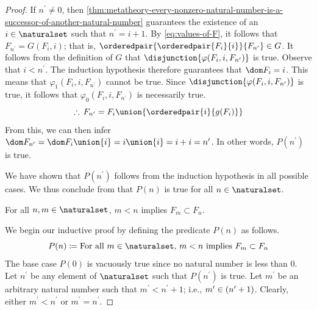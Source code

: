 \begin{proof}
    \vspace{0.3cm}
    \noindent
    If \( n^{\prime} \neq 0 \), then \cref{thm:metatheory-every-nonzero-natural-number-is-a-successor-of-another-natural-number} guarantees the existence
    of an \( i \in \naturalset \) such that \( n^{\prime} = i + 1 \).
    By \eqref{eq:values-of-F}, it follows that \( F_{n^{\prime}} = G(F_{i}, i) \); that is,
    \( \orderedpair{\orderedpair{F_{i}}{i}}{F_{n^{\prime}}} \in G \).
    It follows from the definition of \( G \) that \( \disjunction{\varphi(F_{i}, i, F_{n^{\prime}})} \) is true.
    Observe that \( i < n^{\prime} \). The induction hypothesis therefore guarantees that \( \dom F_{i} = i \).
    This means that \( \varphi_{1}(F_{i}, i, F_{n^{\prime}}) \) cannot be true.
    Since \( \disjunction{\varphi(F_{i}, i, F_{n^{\prime}})} \) is true, it follows that \( \varphi_{0}(F_{i}, i, F_{n^{\prime}}) \) is necessarily true.
    \begin{equation*}
        \therefore \, F_{n^{\prime}} = F_{i} \union \mleft\{ \orderedpair{i}{g(F_{i})} \mright\}
    \end{equation*}
    From this, we can then infer \( \dom F_{n^{\prime}} = \dom F_{i} \union \mleft\{ i \mright\} = i \union \mleft\{ i \mright\} = i + i = n^{\prime} \).
    In other words, \( P(n^{\prime}) \) is true.

    \vspace{0.3cm}
    \noindent
    We have shown that \( P(n^{\prime}) \) follows from the induction hypothesis in all possible cases.
    We thus conclude from  that \( P(n) \) is true for all \( n \in \naturalset \).

    \begin{claim}
         \label{claim:Fn-proper-subset-of-Fm-for-all-n-less-than-m}
        For all \( n, m \in \naturalset \), \( m < n \) implies \( F_{m} \subset F_{n} \).
    \end{claim}
    \noindent
    We begin our inductive proof by defining the predicate \( P(n) \) as follows.
    \begin{equation*}
        P(n) \coloneq \text{For all \( m \in \naturalset \), \( m < n \) implies \( F_{m} \subset F_{n} \)}
    \end{equation*}
    The base case \( P(0) \) is vacuously true since no natural number is less than \( 0 \).
    Let \( n^{\prime} \) be any element of \( \naturalset \) such that \( P(n^{\prime}) \) is true.
    Let \( m^{\prime} \) be an arbitrary natural number such that \( m^{\prime} < n^{\prime} + 1 \); i.e., \( m^{\prime} \in \mleft( n^{\prime} + 1 \mright) \).
    Clearly, either \( m^{\prime} < n^{\prime} \) or \( m^{\prime} = n^{\prime} \).


\end{proof}
